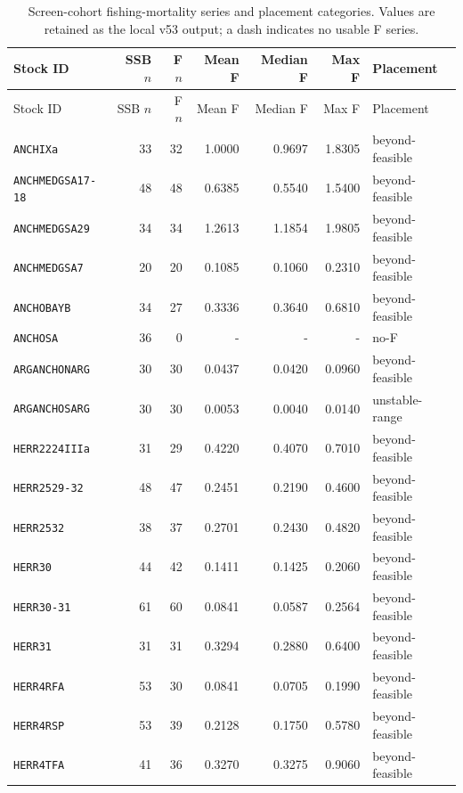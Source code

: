 \begin{landscape}
\scriptsize
\setlength{\tabcolsep}{5pt}
\begin{longtable}{@{}p{3.2cm}r r r r r l@{}}
\caption{Screen-cohort fishing-mortality series and placement categories. Values are retained as the local v53 output; a dash indicates no usable F series.}\label{tab:fplacement}\\
\toprule Stock ID & SSB \(n\) & F \(n\) & Mean F & Median F & Max F & Placement \\
\midrule\endfirsthead
\toprule Stock ID & SSB \(n\) & F \(n\) & Mean F & Median F & Max F & Placement \\
\midrule\endhead
\bottomrule\endfoot
\texttt{ANCHIXa} & 33 & 32 & 1.0000 & 0.9697 & 1.8305 & beyond-feasible \\
\texttt{ANCHMEDGSA17-18} & 48 & 48 & 0.6385 & 0.5540 & 1.5400 & beyond-feasible \\
\texttt{ANCHMEDGSA29} & 34 & 34 & 1.2613 & 1.1854 & 1.9805 & beyond-feasible \\
\texttt{ANCHMEDGSA7} & 20 & 20 & 0.1085 & 0.1060 & 0.2310 & beyond-feasible \\
\texttt{ANCHOBAYB} & 34 & 27 & 0.3336 & 0.3640 & 0.6810 & beyond-feasible \\
\texttt{ANCHOSA} & 36 & 0 & - & - & - & no-F \\
\texttt{ARGANCHONARG} & 30 & 30 & 0.0437 & 0.0420 & 0.0960 & beyond-feasible \\
\texttt{ARGANCHOSARG} & 30 & 30 & 0.0053 & 0.0040 & 0.0140 & unstable-range \\
\texttt{HERR2224IIIa} & 31 & 29 & 0.4220 & 0.4070 & 0.7010 & beyond-feasible \\
\texttt{HERR2529-32} & 48 & 47 & 0.2451 & 0.2190 & 0.4600 & beyond-feasible \\
\texttt{HERR2532} & 38 & 37 & 0.2701 & 0.2430 & 0.4820 & beyond-feasible \\
\texttt{HERR30} & 44 & 42 & 0.1411 & 0.1425 & 0.2060 & beyond-feasible \\
\texttt{HERR30-31} & 61 & 60 & 0.0841 & 0.0587 & 0.2564 & beyond-feasible \\
\texttt{HERR31} & 31 & 31 & 0.3294 & 0.2880 & 0.6400 & beyond-feasible \\
\texttt{HERR4RFA} & 53 & 30 & 0.0841 & 0.0705 & 0.1990 & beyond-feasible \\
\texttt{HERR4RSP} & 53 & 39 & 0.2128 & 0.1750 & 0.5780 & beyond-feasible \\
\texttt{HERR4TFA} & 41 & 36 & 0.3270 & 0.3275 & 0.9060 & beyond-feasible \\

\end{longtable}
\end{landscape}
